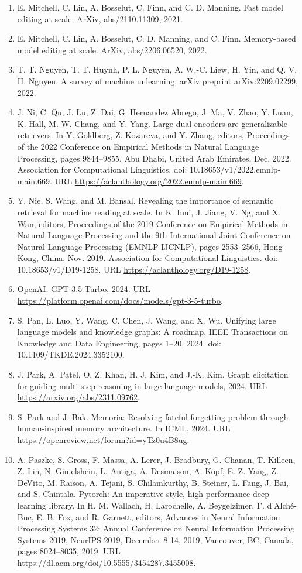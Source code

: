 \documentclass[11pt,UTF8,fontset=fandol]{ctexart}
\begin{document}
\begin{enumerate}[leftmargin=2em]
\item E. Mitchell, C. Lin, A. Bosselut, C. Finn, and C. D. Manning. Fast model editing at scale. ArXiv, abs/2110.11309, 2021.
\item E. Mitchell, C. Lin, A. Bosselut, C. D. Manning, and C. Finn. Memory-based model editing at scale. ArXiv, abs/2206.06520, 2022.
\item T. T. Nguyen, T. T. Huynh, P. L. Nguyen, A. W.-C. Liew, H. Yin, and Q. V. H. Nguyen. A survey of machine unlearning. arXiv preprint arXiv:2209.02299, 2022.
\item J. Ni, C. Qu, J. Lu, Z. Dai, G. Hernandez Abrego, J. Ma, V. Zhao, Y. Luan, K. Hall, M.-W. Chang, and Y. Yang. Large dual encoders are generalizable retrievers. In Y. Goldberg, Z. Kozareva, and Y. Zhang, editors, Proceedings of the 2022 Conference on Empirical Methods in Natural Language Processing, pages 9844--9855, Abu Dhabi, United Arab Emirates, Dec. 2022. Association for Computational Linguistics. doi: 10.18653/v1/2022.emnlp-main.669. URL \url{https://aclanthology.org/2022.emnlp-main.669}.
\item Y. Nie, S. Wang, and M. Bansal. Revealing the importance of semantic retrieval for machine reading at scale. In K. Inui, J. Jiang, V. Ng, and X. Wan, editors, Proceedings of the 2019 Conference on Empirical Methods in Natural Language Processing and the 9th International Joint Conference on Natural Language Processing (EMNLP-IJCNLP), pages 2553--2566, Hong Kong, China, Nov. 2019. Association for Computational Linguistics. doi: 10.18653/v1/D19-1258. URL \url{https://aclanthology.org/D19-1258}.
\item OpenAI. GPT-3.5 Turbo, 2024. URL \url{https://platform.openai.com/docs/models/gpt-3-5-turbo}.
\item S. Pan, L. Luo, Y. Wang, C. Chen, J. Wang, and X. Wu. Unifying large language models and knowledge graphs: A roadmap. IEEE Transactions on Knowledge and Data Engineering, pages 1--20, 2024. doi: 10.1109/TKDE.2024.3352100.
\item J. Park, A. Patel, O. Z. Khan, H. J. Kim, and J.-K. Kim. Graph elicitation for guiding multi-step reasoning in large language models, 2024. URL \url{https://arxiv.org/abs/2311.09762}.
\item S. Park and J. Bak. Memoria: Resolving fateful forgetting problem through human-inspired memory architecture. In ICML, 2024. URL \url{https://openreview.net/forum?id=yTz0u4B8ug}.
\item A. Paszke, S. Gross, F. Massa, A. Lerer, J. Bradbury, G. Chanan, T. Killeen, Z. Lin, N. Gimelshein, L. Antiga, A. Desmaison, A. K\"opf, E. Z. Yang, Z. DeVito, M. Raison, A. Tejani, S. Chilamkurthy, B. Steiner, L. Fang, J. Bai, and S. Chintala. Pytorch: An imperative style, high-performance deep learning library. In H. M. Wallach, H. Larochelle, A. Beygelzimer, F. d'Alch\'e-Buc, E. B. Fox, and R. Garnett, editors, Advances in Neural Information Processing Systems 32: Annual Conference on Neural Information Processing Systems 2019, NeurIPS 2019, December 8-14, 2019, Vancouver, BC, Canada, pages 8024--8035, 2019. URL \url{https://dl.acm.org/doi/10.5555/3454287.3455008}.

\end{enumerate}
\end{document}
